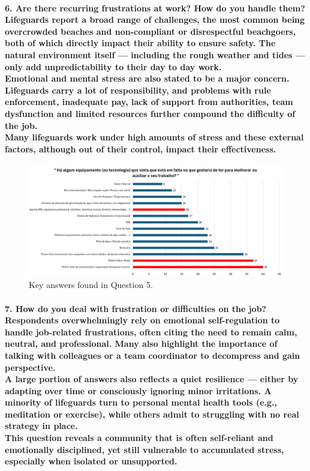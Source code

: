 \paragraph{
\textbf{6. Are there recurring frustrations at work? How do you handle them?}
\\
Lifeguards report a broad range of challenges, the most common being overcrowded beaches and non-compliant or disrespectful beachgoers, both of which directly impact their ability to ensure safety. The natural environment itself — including the rough weather and tides — only add unpredictability to their day to day work.
\\ 
Emotional and mental stress are also stated to be a major concern. Lifeguards carry a lot of responsibility, and problems with rule enforcement, inadequate pay, lack of support from authorities, team dysfunction and limited resources further compound the difficulty of the job. 
\\
Many lifeguards work under high amounts of stress and these external factors, although out of their control, impact their effectiveness.}

\begin{figure}[H]
      \centering
      \includegraphics[width=16cm]{figs/questiongraf/image7.png}
      \caption{Key answers found in Question 5.}
      \label{fig:question5}
\end{figure}

\paragraph{
\textbf{7. How do you deal with frustration or difficulties on the job?}
\\
Respondents overwhelmingly rely on emotional self-regulation to handle job-related frustrations, often citing the need to remain calm, neutral, and professional. Many also highlight the importance of talking with colleagues or a team coordinator to decompress and gain perspective.
\\
A large portion of answers also reflects a quiet resilience — either by adapting over time or consciously ignoring minor irritations. A minority of lifeguards turn to personal mental health tools (e.g., meditation or exercise), while others admit to struggling with no real strategy in place.
\\
This question reveals a community that is often self-reliant and emotionally disciplined, yet still vulnerable to accumulated stress, especially when isolated or unsupported.}

